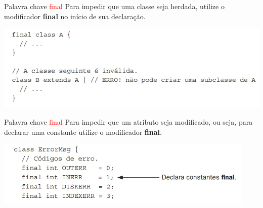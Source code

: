 \documentclass[11pt,aspectratio=43,ignorenonframetext,t]{beamer}
\begin{document}
\begin{frame}{Palavra chave \textcolor{red}{final}}
  Para impedir que uma classe seja herdada, utilize o modificador 
  \textbf{final} no início de sua declaração.
  \begin{center}
  \includegraphics[height=0.35\paperheight]{fig/aula16/final_heranca.png} \\
 \end{center}
\end{frame}
\begin{frame}{Palavra chave \textcolor{red}{final}}
  Para impedir que um atributo seja modificado, ou seja, para declarar uma 
  constante utilize o modificador \textbf{final}.
  \begin{center}
  \includegraphics[height=0.25\paperheight]{fig/aula16/final_variavel.png} \\
 \end{center}
\end{frame}
\end{document}
